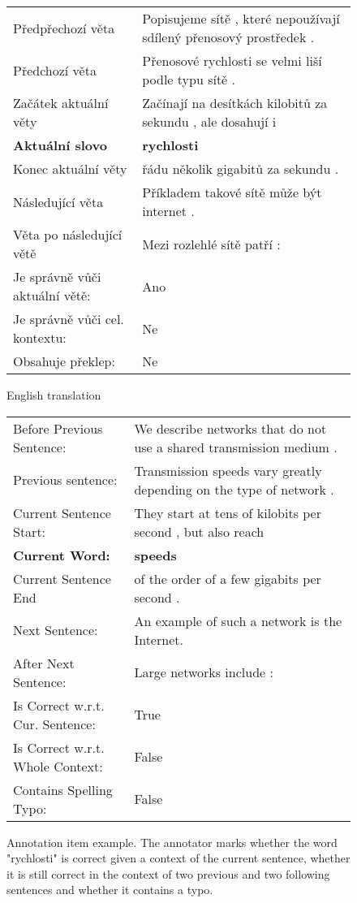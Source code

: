\documentclass{pbmlarxiv}
\newenvironment{framedexample}{\begin{center}\begin{minipage}[c]{1\hsize}\setlength{\FrameSep}{5pt}\begin{framed}\setlength{\parskip}{4pt}}{\end{framed}\end{minipage}\end{center}}
\newcommand{\englishexamples}[1]{\begin{center}\small English translation #1\end{center}}
\begin{document}
\begin{figure}[t]
    \footnotesize
    \begin{framedexample}
    \begin{tabular}{l|l}
Předpřechozí věta & Popisujeme sítě , které nepoužívají sdílený přenosový prostředek .\\
        Předchozí věta & Přenosové rychlosti se velmi liší podle typu sítě . \\
        Začátek aktuální věty & Začínají na desítkách kilobitů za sekundu , ale dosahují i \\
        \textbf{Aktuální slovo} & \textbf{rychlosti} \\
        Konec aktuální věty & řádu několik gigabitů za sekundu . \\
        Následující věta & Příkladem takové sítě může být internet .\\
        Věta po následující větě & Mezi rozlehlé sítě patří : \\
        Je správně vůči aktuální větě: & Ano \\
        Je správně vůči cel. kontextu: & Ne \\
        Obsahuje překlep: & Ne 
    \end{tabular}
    \end{framedexample}

\itshape
    \begin{framedexample}
    \englishexamples{}
    \begin{tabular}{l|l}
Before Previous Sentence: & We describe networks that do not use a shared transmission medium .\\
        Previous sentence: & Transmission speeds vary greatly depending on the type of network . \\
        Current Sentence Start: & They start at tens of kilobits per second , but also reach \\
        \textbf{Current Word:} & \textbf{speeds} \\
        Current Sentence End & of the order of a few gigabits per second . \\
        Next Sentence: & An example of such a network is the Internet.\\
        After Next Sentence: & Large networks include : \\
        Is Correct w.r.t. Cur. Sentence: & True \\
        Is Correct w.r.t. Whole Context: & False \\
        Contains Spelling Typo: & False 
    \end{tabular}
    \end{framedexample}
    
    \caption{Annotation item example. The annotator marks whether the word "rychlosti" is correct given a context of the current sentence, whether it is still correct in the context of two previous and two following sentences and whether it contains a typo.}
    \label{table:annotation_item}
\end{figure}
\end{document}

